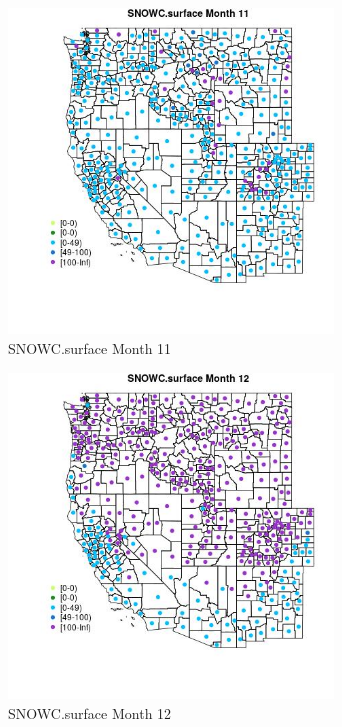 \begin{figure} 
\centering  
\includegraphics[width=0.77\textwidth]{Code_Outputs/df_report_ML_predictors_CountyCentroid_Locations_Dates_2008-01-01to2018-12-31_MapObsMo11SNOWCsurface.jpg} 
\caption{\label{fig:df_report_ML_predictors_CountyCentroid_Locations_Dates_2008-01-01to2018-12-31MapObsMo11SNOWCsurface}SNOWC.surface Month 11} 
\end{figure} 
 

\begin{figure} 
\centering  
\includegraphics[width=0.77\textwidth]{Code_Outputs/df_report_ML_predictors_CountyCentroid_Locations_Dates_2008-01-01to2018-12-31_MapObsMo12SNOWCsurface.jpg} 
\caption{\label{fig:df_report_ML_predictors_CountyCentroid_Locations_Dates_2008-01-01to2018-12-31MapObsMo12SNOWCsurface}SNOWC.surface Month 12} 
\end{figure} 
 


